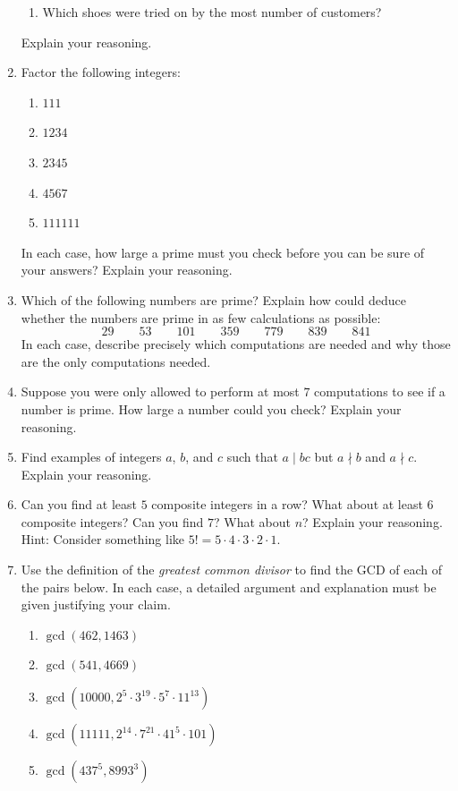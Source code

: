 \begin{problems}
\begin{enumerate}
\begin{enumerate}
\item Which shoes were tried on by the most number of customers?
\end{enumerate}
Explain your reasoning.
\item Factor the following integers:
\begin{enumerate}
\item $111$
\item $1234$
\item $2345$
\item $4567$
\item $111111$
\end{enumerate}
In each case, how large a prime must you check before you can be sure
of your answers? Explain your reasoning.
\item Which of the following numbers are prime?  Explain how could deduce whether the numbers are prime in
  as few calculations as possible:
\[
29 \qquad 53 \qquad 101 \qquad 359 \qquad 779 \qquad 839 \qquad 841
\]
In each case, describe precisely which computations are needed and
why those are the only computations needed.
\item Suppose you were only allowed to perform at most $7$
  computations to see if a number is prime. How large a number could
  you check?  Explain your reasoning.
\item Find examples of integers $a$, $b$, and $c$ such that $a \mid
  bc$ but $a\nmid b$ and $a\nmid c$. Explain your reasoning.
\item Can you find at least $5$ composite integers in a row? What
  about at least $6$ composite integers? Can you find $7$?
  What about $n$?  Explain your reasoning. Hint: Consider something
  like $5! = 5\cdot 4 \cdot 3 \cdot 2 \cdot 1$.
\item Use the definition of the \textit{greatest common divisor} to
  find the GCD of each of the pairs below. In each
  case, a detailed argument and explanation must be given justifying
  your claim.
\begin{enumerate}
\item $\gcd(462,1463)$
\item $\gcd(541,4669)$ 
\item $\gcd(10000,2^5\cdot 3^{19}\cdot 5^7\cdot 11^{13})$
\item $\gcd(11111,2^{14}\cdot 7^{21}\cdot 41^{5}\cdot 101)$
\item $\gcd(437^5,8993^3)$
\end{enumerate}


\end{enumerate}
\end{problems}
